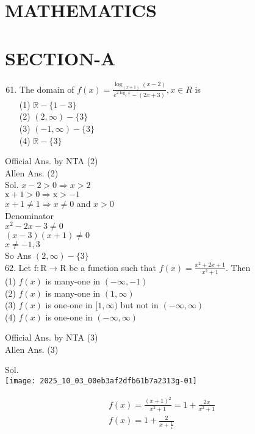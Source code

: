 \documentclass[10pt]{article}
\begin{document}
\section*{MATHEMATICS}
\section*{SECTION-A}
\begin{enumerate}
  \setcounter{enumi}{60}
  \item The domain of \(f(x)=\frac{\log _{(x+1)}(x-2)}{e^{2 \log _{e} x}-(2 x+3)}, x \in R\) is\\
(1) \(\mathbb{R}-\{1-3\}\)\\
(2) \((2, \infty)-\{3\}\)\\
(3) \((-1, \infty)-\{3\}\)\\
(4) \(\mathbb{R}-\{3\}\)
\end{enumerate}

Official Ans. by NTA (2)\\
Allen Ans. (2)\\
Sol. \(x-2>0 \Rightarrow x>2\)\\
\(\mathrm{x}+1>0 \Rightarrow \mathrm{x}>-1\)\\
\(x+1 \neq 1 \Rightarrow x \neq 0\) and \(x>0\)\\
Denominator\\
\(x^{2}-2 x-3 \neq 0\)\\
\((x-3)(x+1) \neq 0\)\\
\(x \neq-1,3\)\\
So Ans \((2, \infty)-\{3\}\)\\
62. Let \(\mathrm{f}: \mathrm{R} \rightarrow \mathrm{R}\) be a function such that \(f(x)=\frac{x^{2}+2 x+1}{x^{2}+1}\). Then\\
(1) \(f(x)\) is many-one in \((-\infty,-1)\)\\
(2) \(f(x)\) is many-one in \((1, \infty)\)\\
(3) \(f(x)\) is one-one in \([1, \infty)\) but not in \((-\infty, \infty)\)\\
(4) \(f(x)\) is one-one in \((-\infty, \infty)\)

Official Ans. by NTA (3)\\
Allen Ans. (3)

Sol.\\
\texttt{[image: 2025\_10\_03\_00eb3af2dfb61b7a2313g-01]}

\[
\begin{aligned}
& f(x)=\frac{(x+1)^{2}}{x^{2}+1}=1+\frac{2 x}{x^{2}+1} \\
& f(x)=1+\frac{2}{x+\frac{1}{x}}
\end{aligned}
\]
\end{document}
